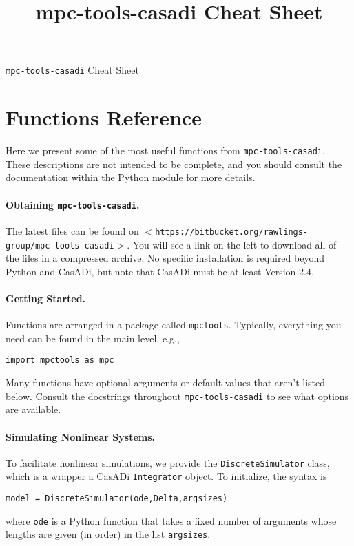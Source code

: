 \documentclass{article}
\title{mpc-tools-casadi Cheat Sheet}
\newcommand{\smallurl}[2][\scriptsize]{\texttt{#1$<$#2$>$}}
\newcommand{\casadi}{CasADi}
\begin{document}
\begin{center}
    \LARGE \texttt{mpc-tools-casadi} Cheat Sheet
\end{center}

\section{Functions Reference}

Here we present some of the most useful functions from \texttt{mpc-tools-casadi}.
These descriptions are not intended to be complete, and you should consult the documentation within the Python module for more details.

\begin{multicols}{2}

\paragraph*{Obtaining \texttt{mpc-tools-casadi}.}

The latest files can be found on \smallurl{https://bitbucket.org/rawlings-group/mpc-tools-casadi}.
You will see a link on the left to download all of the files in a compressed archive.
No specific installation is required beyond Python and \casadi{}, but note that \casadi{} must be at least Version 2.4.

\paragraph*{Getting Started.}

Functions are arranged in a package called \texttt{mpctools}.
Typically, everything you need can be found in the main level, e.g.,
%
\begin{lstlisting}[frame=L]
import mpctools as mpc
\end{lstlisting}

Many functions have optional arguments or default values that aren't listed below.
Consult the docstrings throughout \texttt{mpc-tools-casadi} to see what options are available.

\paragraph*{Simulating Nonlinear Systems.}

To facilitate nonlinear simulations, we provide the \texttt{DiscreteSimulator} class, which is a wrapper a \casadi{} \texttt{Integrator} object.
To initialize, the syntax is
%
\begin{lstlisting}[frame=L]
model = DiscreteSimulator(ode,Delta,argsizes)
\end{lstlisting}
%
where \texttt{ode} is a Python function that takes a fixed number of arguments whose lengths are given (in order) in the list \texttt{argsizes}.


\end{multicols}
\end{document}
